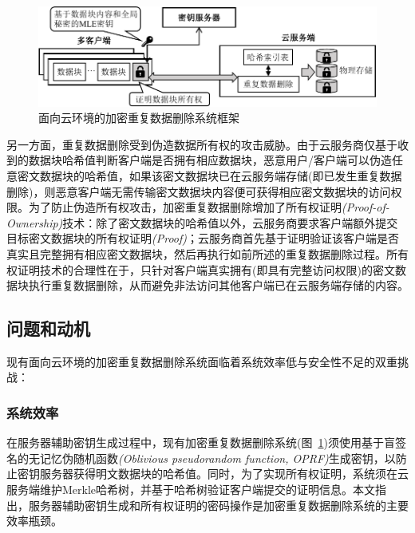 \begin{figure}[!htb]
    \small
    \centering
    \includegraphics[width=\textwidth]{pic/background/Cloud-encrypted-deduplication-logic.pdf}
    \caption{面向云环境的加密重复数据删除系统框架}
    \label{fig:Cloud-based-encrypted-deduplication-storage-logic}
\end{figure}

另一方面，重复数据删除受到伪造数据所有权的攻击威胁。由于云服务商仅基于收到的数据块哈希值判断客户端是否拥有相应数据块，恶意用户/客户端可以伪造任意密文数据块的哈希值，如果该密文数据块已在云服务端存储(即已发生重复数据删除)，则恶意客户端无需传输密文数据块内容便可获得相应密文数据块的访问权限。为了防止伪造所有权攻击，加密重复数据删除增加了所有权证明\textit{(Proof-of-Ownership)}技术：除了密文数据块的哈希值以外，云服务商要求客户端额外提交目标密文数据块的所有权证明\textit{(Proof)}；云服务商首先基于证明验证该客户端是否真实且完整拥有相应密文数据块，然后再执行如前所述的重复数据删除过程。所有权证明技术的合理性在于，只针对客户端真实拥有(即具有完整访问权限)的密文数据块执行重复数据删除，从而避免非法访问其他客户端已在云服务端存储的内容。

\subsection{问题和动机}
\label{subsec:intro-problem}

现有面向云环境的加密重复数据删除系统面临着系统效率低与安全性不足的双重挑战：

\subsubsection{系统效率}
\label{subsubsec:intro-problem-performance}

在服务器辅助密钥生成过程中，现有加密重复数据删除系统(图~\ref{fig:Cloud-based-encrypted-deduplication-storage-logic})须使用基于盲签名的无记忆伪随机函数\textit{(Oblivious pseudorandom function, OPRF)}生成密钥，以防止密钥服务器获得明文数据块的哈希值。同时，为了实现所有权证明，系统须在云服务端维护Merkle哈希树，并基于哈希树验证客户端提交的证明信息。本文指出，服务器辅助密钥生成和所有权证明的密码操作是加密重复数据删除系统的主要效率瓶颈。

